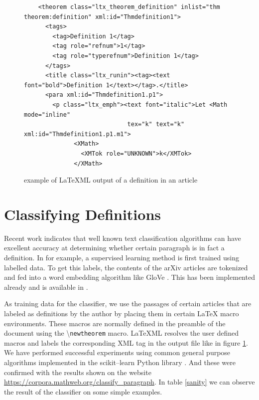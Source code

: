 \documentclass[a4paper]{easychair}
\begin{document}
\begin{center}
\begin{figure}[h]
\begin{lstlisting}
    <theorem class="ltx_theorem_definition" inlist="thm theorem:definition" xml:id="Thmdefinition1">
      <tags>
        <tag>Definition 1</tag>
        <tag role="refnum">1</tag>
        <tag role="typerefnum">Definition 1</tag>
      </tags>
      <title class="ltx_runin"><tag><text font="bold">Definition 1</text></tag>.</title>
      <para xml:id="Thmdefinition1.p1">
        <p class="ltx_emph"><text font="italic">Let <Math mode="inline" 
                             tex="k" text="k" xml:id="Thmdefinition1.p1.m1">
              <XMath>
                <XMTok role="UNKNOWN">k</XMTok>
              </XMath>
\end{lstlisting}
    \caption{\label{xml1} example of LaTeXML output of a definition in an article}
\end{figure}
\end{center}


\section{Classifying Definitions}
Recent work indicates that well known text classification algorithms \cite{bengio2003neural,chen2017improving} can have excellent accuracy  at determining whether certain paragraph is in fact a definition. In \cite{webscipara} for example, a supervised learning method is first trained using labelled data. To get this labels, the contents of the arXiv articles are tokenized and fed into a word embedding algorithm like GloVe \cite{pennington2014glove}. This has been  implemented already and is available in \cite{SML}. 

As training data for the classifier, we use the passages of certain articles that are labeled as definitions by the author by placing them in certain \LaTeX{} macro environments. These macros are normally defined in the preamble of the document using the \textbackslash \texttt{newtheorem} macro. LaTeXML resolves the user defined macros and labels  the corresponding XML tag in the output file like in figure \ref{xml1}. We have performed successful experiments  using common general purpose algorithms implemented in the scikit--learn Python library \cite{scikit-learn}. And these were confirmed with the results shown on the website \url{https://corpora.mathweb.org/classify_paragraph}.
In table \ref{sanity} we can observe the result of the classifier on some simple examples.
\end{document}
